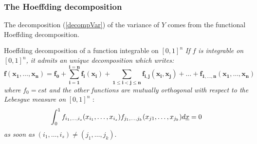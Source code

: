 \documentclass[8pt]{beamer}
\begin{document}
\begin{frame}
\frametitle{The Hoeffding decomposition}
\small
The  decomposition (\ref{decompVar}) of the  variance of $Y$  comes from the functional Hoeffding decomposition.

\begin{block}{Hoeffding decomposition of a function integrable on $[0,1]^n$}
\textit{If $f$ is integrable on $[0,1]^n$, it admits an unique decomposition which writes: }
\begin{equation}
\label{decompSobol}
\boldsymbol{ f(x_1, \dots, x_n) = f_0 + \sum_{i=1}^{i=n}f_i(x_i) + \sum_{1\leq i < j \leq n} f_{i,j} (x_i, x_j) + \dots + f_{1, \dots, n}(x_1, \dots, x_n)}
\end{equation}
\textit{where} $f_0 = cst$ \textit{and the other functions are mutually orthogonal with respect to the Lebesgue measure on } $[0,1]^n$ :
\begin{equation}
\label{decompSobolCondOrthog}
 \int_0^1 f_{i_1, \dots, i_s}(x_{i_1}, \dots, x_{i_s})f_{j_1, \dots, j_k}(x_{j1}, \dots, x_{j_k}) d{\underline{x}} = 0
\end{equation}
\textit{as soon as} $(i_1, \dots, i_s) \neq (j_1, \dots, j_k)$.
\end{block}

\end{frame}
\end{document}
